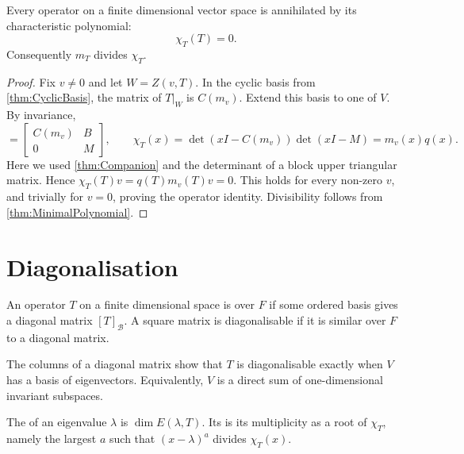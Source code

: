 \begin{Theorem}\label{thm:CayleyHamilton}
Every operator on a finite dimensional vector space is annihilated by its characteristic polynomial:
\begin{equation*}
\chi_T(T)=0.
\end{equation*}
Consequently $m_T$ divides $\chi_T$.
\end{Theorem}
\begin{proof}
Fix $v\ne0$ and let $W=Z(v,T)$. In the cyclic basis from \cref{thm:CyclicBasis}, the matrix of $T|_W$ is $C(m_v)$. Extend this basis to one of $V$. By invariance,
\begin{equation*}
[T]=\begin{bmatrix}C(m_v)&B\\0&M\end{bmatrix},\qquad \chi_T(x)=\det(xI-C(m_v))\det(xI-M)=m_v(x)q(x).
\end{equation*}
Here we used \cref{thm:Companion} and the determinant of a block upper triangular matrix. Hence $\chi_T(T)v=q(T)m_v(T)v=0$. This holds for every non-zero $v$, and trivially for $v=0$, proving the operator identity. Divisibility follows from \cref{thm:MinimalPolynomial}.
\end{proof}

\section{Diagonalisation}\label{sec:Diagonalisation}

\begin{Definition}
An operator $T$ on a finite dimensional space is  over $F$ if some ordered basis gives a diagonal matrix $[T]_{\mathcal B}$. A square matrix is diagonalisable if it is similar over $F$ to a diagonal matrix.
\end{Definition}

The columns of a diagonal matrix show that $T$ is diagonalisable exactly when $V$ has a basis of eigenvectors. Equivalently, $V$ is a direct sum of one-dimensional invariant subspaces.

\begin{Definition}
The  of an eigenvalue $\lambda$ is $\dim E(\lambda,T)$. Its  is its multiplicity as a root of $\chi_T$, namely the largest $a$ such that $(x-\lambda)^a$ divides $\chi_T(x)$.
\end{Definition}

